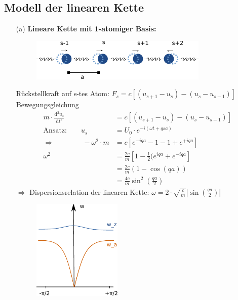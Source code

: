 \subsection{Modell der linearen Kette} \label{kap:4_2}
\begin{itemize}
	\item[(a)] \textbf{Lineare Kette mit 1-atomiger Basis:}\\
	\begin{figure}[H]
		\centering
		\includegraphics[width=0.8\textwidth]{figures/4_2linKette}
		\caption{}
		\label{}
	\end{figure}
	Rückstellkraft auf s-tes Atom: $F_s = c [(u_{s+1} - u_s) - (u_s - u_{s-1})]$
	Bewegungsgleichung
	\begin{align*}
		m \cdot\frac{\mathrm{d}^2 u_s}{\mathrm{d}t^2} &= c [(u_{s+1} - u_s) - (u_s - u_{s-1})]\\
		\text{Ansatz:} \qquad u_s &= U_0 \cdot e^{-i(\omega t + q s a)}\\
		\Rightarrow \qquad \qquad -\omega^2 \cdot m &= c [e^{-iqa} -1-1+e^{+iqa}]\\
		\omega^2 &= \frac{2 c}{m} [1 - \frac{1}{2} (e^{iqa} +e^{-iqa}]\\
		&= \frac{2 c}{m} (1- \cos(qa))\\
		&= \frac{4 c}{m} \sin^2\left(\frac{qa}{2}\right)
	\end{align*}
	$\Rightarrow$ Dispersionsrelation der linearen Kette: $\omega = 2 \cdot \sqrt{\frac{c}{m}}\left|\sin\left(\frac{qa}{2}\right)\right|$ \\
	\begin{figure}[H]
		\centering
		\includegraphics[width=0.4\textwidth]{figures/4_2disp}

\end{figure}
\end{itemize}
